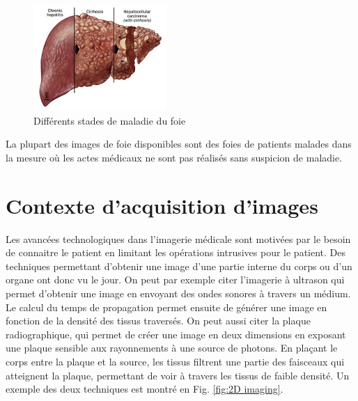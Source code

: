 \begin{figure}
    \centering
    \includegraphics[height=4cm]{Images/Liver_cirrhosis_stages.jpg}
    \caption{Différents stades de maladie du foie}
    \label{fig:unhealthy liver}
\end{figure}

La plupart des images de foie disponibles sont des foies de patients malades dans la mesure où les actes médicaux ne sont pas réalisés sans suspicion de maladie.

\section{Contexte d'acquisition d'images}
\label{sec:contexte:images}

Les avancées technologiques dans l'imagerie médicale sont motivées par le besoin de connaitre le patient en limitant les opérations intrusives pour le patient. Des techniques permettant d'obtenir une image d'une partie interne du corps ou d'un organe ont donc vu le jour. On peut par exemple citer l'imagerie à ultrason qui permet d'obtenir une image en envoyant des ondes sonores à travers un médium. Le calcul du temps de propagation permet ensuite de générer une image en fonction de la densité des tissus traversés. On peut aussi citer la plaque radiographique, qui permet de créer une image en deux dimensions en exposant une plaque sensible aux rayonnements à une source de photons. En plaçant le corps entre la plaque et la source, les tissus filtrent une partie des faisceaux qui atteignent la plaque, permettant de voir à travers les tissus de faible densité. Un exemple des deux techniques est montré en Fig. \ref{fig:2D imaging}.

